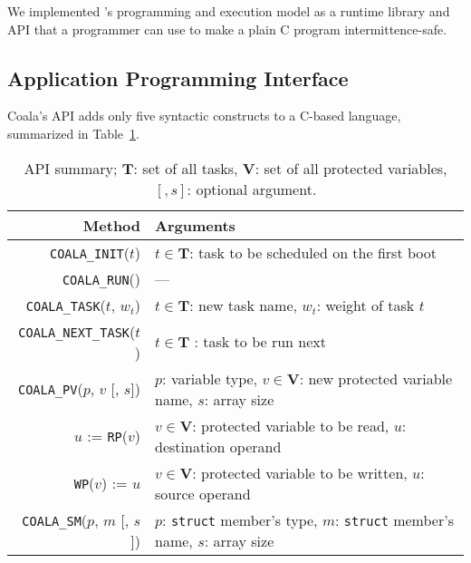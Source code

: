 We implemented \sys's programming and execution model as a runtime library and API that a programmer can use to make a plain C program intermittence-safe.

\subsection{Application Programming Interface}
\label{sec:coala_api}

Coala's API adds only five syntactic constructs to a C-based language, summarized
in Table~\ref{table:coala_api}.


\begin{table}
\centering
\begin{tabular}{| r | p{} |}
	\hline
	{Method} & {Arguments} \\
	\hline\hline
	\texttt{COALA\_INIT}($t$) & $t \in \mathbf{T}$: task to be scheduled on the first boot \\
	\hline
	\texttt{COALA\_RUN}() & --- \\
	\hline
	\texttt{COALA\_TASK}($t$, $w_t$) & $t \in \mathbf{T}$: new task name, $w_t$: weight of task $t$ \\
	\hline
	\texttt{COALA\_NEXT\_TASK}($t$) & $t \in \mathbf{T}$ : task to be run next \\
	\hline
	\texttt{COALA\_PV}($p$, $v$ [, $s$]) & $p$: variable type, $v \in \mathbf{V}$: new protected variable name, $s$: array size \\
	\hline
	$u$ := \texttt{RP}($v$) & $v \in \mathbf{V}$: protected variable to be read, $u$: destination operand \\
	\hline	
	\texttt{WP}($v$) := $u$ &  $v \in \mathbf{V}$: protected variable to be written, $u$: source operand \\
	\hline
	\texttt{COALA\_SM}($p$, $m$ [, $s$]) & $p$: \texttt{struct} member's type, $m$: \texttt{struct} member's name, $s$: array size \\
	\hline
\end{tabular}
\caption{API summary; $\mathbf{T}$: set of all tasks, $\mathbf{V}$: set of all protected variables, $[, s]$: optional argument.}
\label{table:coala_api}
\end{table}


